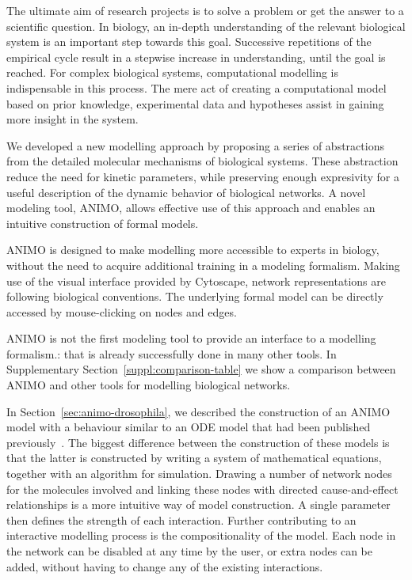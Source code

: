 The ultimate aim of research projects is to solve a problem or get
the answer to a scientific question. In biology, an in-depth understanding of
the relevant biological system is an important step towards this goal. Successive 
repetitions of the empirical cycle result in a stepwise increase in understanding,
until the goal is reached. For complex biological systems, computational modelling is 
indispensable in this process. The mere act of creating 
a computational model based on prior knowledge, experimental data and hypotheses 
assist in gaining more insight in the system. 


We developed a new modelling approach by proposing a series of abstractions from the detailed 
molecular mechanisms of biological systems. These abstraction reduce the need for kinetic 
parameters, while preserving enough expresivity for a useful description of the dynamic 
behavior of biological networks. A novel modeling tool, ANIMO, allows 
effective use of this approach and enables an intuitive construction of formal models.

ANIMO is designed to make modelling more accessible to experts in biology,
without the need to acquire additional training in a modeling formalism. Making use of the visual
interface provided by Cytoscape, network representations are following biological conventions. The
underlying formal model can be directly accessed by mouse-clicking on nodes and edges.



ANIMO is not the first modeling tool to provide an interface to a
modelling formalism.: that is already successfully done in many other tools.
In Supplementary Section~\ref{suppl:comparison-table} we show a
comparison between ANIMO and other tools for modelling biological networks.

In Section~\ref{sec:animo-drosophila}, we described the construction of an ANIMO
model with a behaviour similar to an ODE model that had been
published previously~\citep{drosophila-ode-model}. The biggest
difference between the construction of these models is that the latter
is constructed by writing a system of mathematical equations, together
with an algorithm for simulation. Drawing a number of network
nodes for the molecules involved and linking these nodes with directed
cause-and-effect relationships is a more intuitive way of model
construction. A single parameter then defines the strength of each
interaction. Further contributing to an interactive modelling process
is the compositionality of the model. Each node in the network
can be disabled at any time by the user, or extra nodes can be added,
without having to change any of the existing interactions.

